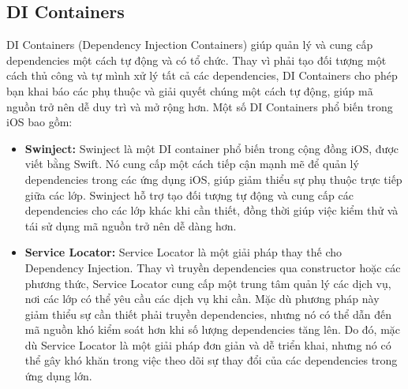   \subsection{DI Containers}
    DI Containers (Dependency Injection Containers) giúp quản lý và cung cấp dependencies một cách tự động và có tổ chức. Thay vì phải tạo đối tượng một cách thủ công và tự mình xử lý tất cả các dependencies, DI Containers cho phép bạn khai báo các phụ thuộc và giải quyết chúng một cách tự động, giúp mã nguồn trở nên dễ duy trì và mở rộng hơn. Một số DI Containers phổ biến trong iOS bao gồm:

    \begin{itemize}
      \item \textbf{Swinject:} Swinject là một DI container phổ biến trong cộng đồng iOS, được viết bằng Swift. Nó cung cấp một cách tiếp cận mạnh mẽ để quản lý dependencies trong các ứng dụng iOS, giúp giảm thiểu sự phụ thuộc trực tiếp giữa các lớp. Swinject hỗ trợ tạo đối tượng tự động và cung cấp các dependencies cho các lớp khác khi cần thiết, đồng thời giúp việc kiểm thử và tái sử dụng mã nguồn trở nên dễ dàng hơn.
      \item \textbf{Service Locator:} Service Locator là một giải pháp thay thế cho Dependency Injection. Thay vì truyền dependencies qua constructor hoặc các phương thức, Service Locator cung cấp một trung tâm quản lý các dịch vụ, nơi các lớp có thể yêu cầu các dịch vụ khi cần. Mặc dù phương pháp này giảm thiểu sự cần thiết phải truyền dependencies, nhưng nó có thể dẫn đến mã nguồn khó kiểm soát hơn khi số lượng dependencies tăng lên. Do đó, mặc dù Service Locator là một giải pháp đơn giản và dễ triển khai, nhưng nó có thể gây khó khăn trong việc theo dõi sự thay đổi của các dependencies trong ứng dụng lớn.
    \end{itemize}

